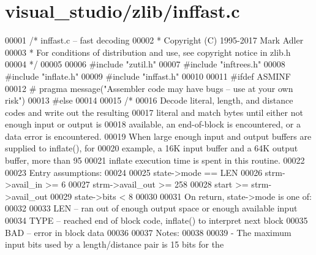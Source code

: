 \hypertarget{visual__studio_2zlib_2inffast_8c_source}{}\section{visual\+\_\+studio/zlib/inffast.c}
\label{visual__studio_2zlib_2inffast_8c_source}

\begin{DoxyCode}
00001 \textcolor{comment}{/* inffast.c -- fast decoding}
00002 \textcolor{comment}{ * Copyright (C) 1995-2017 Mark Adler}
00003 \textcolor{comment}{ * For conditions of distribution and use, see copyright notice in zlib.h}
00004 \textcolor{comment}{ */}
00005 
00006 \textcolor{preprocessor}{#include "zutil.h"}
00007 \textcolor{preprocessor}{#include "inftrees.h"}
00008 \textcolor{preprocessor}{#include "inflate.h"}
00009 \textcolor{preprocessor}{#include "inffast.h"}
00010 
00011 \textcolor{preprocessor}{#ifdef ASMINF}
00012 \textcolor{preprocessor}{#  pragma message("Assembler code may have bugs -- use at your own risk")}
00013 \textcolor{preprocessor}{#else}
00014 
00015 \textcolor{comment}{/*}
00016 \textcolor{comment}{   Decode literal, length, and distance codes and write out the resulting}
00017 \textcolor{comment}{   literal and match bytes until either not enough input or output is}
00018 \textcolor{comment}{   available, an end-of-block is encountered, or a data error is encountered.}
00019 \textcolor{comment}{   When large enough input and output buffers are supplied to inflate(), for}
00020 \textcolor{comment}{   example, a 16K input buffer and a 64K output buffer, more than 95%
00021 \textcolor{comment}{   inflate execution time is spent in this routine.}
00022 \textcolor{comment}{}
00023 \textcolor{comment}{   Entry assumptions:}
00024 \textcolor{comment}{}
00025 \textcolor{comment}{        state->mode == LEN}
00026 \textcolor{comment}{        strm->avail\_in >= 6}
00027 \textcolor{comment}{        strm->avail\_out >= 258}
00028 \textcolor{comment}{        start >= strm->avail\_out}
00029 \textcolor{comment}{        state->bits < 8}
00030 \textcolor{comment}{}
00031 \textcolor{comment}{   On return, state->mode is one of:}
00032 \textcolor{comment}{}
00033 \textcolor{comment}{        LEN -- ran out of enough output space or enough available input}
00034 \textcolor{comment}{        TYPE -- reached end of block code, inflate() to interpret next block}
00035 \textcolor{comment}{        BAD -- error in block data}
00036 \textcolor{comment}{}
00037 \textcolor{comment}{   Notes:}
00038 \textcolor{comment}{}
00039 \textcolor{comment}{    - The maximum input bits used by a length/distance pair is 15 bits for the}
}
\end{DoxyCode}
